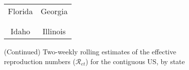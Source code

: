 \documentclass[12pt]{article}
\begin{document}
\begin{figure}[!p]%
\caption
{(Continued) Two-weekly rolling estimates of the effective reproduction numbers ($\mathcal
{R}_{et}$) for the contiguous US, by state}%
\vspace{-0.3cm}%


\begin{center}%
\hspace*{-0.2cm}%
\begin{tabular}
[c]{cc}%
{\footnotesize Florida} & {\footnotesize Georgia}\\%
{\includegraphics[
height=1.7763in,
width=3.5293in
]%
{figs/US-Re-FL-2W.png}%
}
&
{\includegraphics[
height=1.7763in,
width=3.5293in
]%
{figs/US-Re-GA-2W.png}%
}
\\
& \\
{\footnotesize Idaho} & {\footnotesize Illinois}\\%

\end{tabular}
\end{center}
\end{figure}
\end{document}
